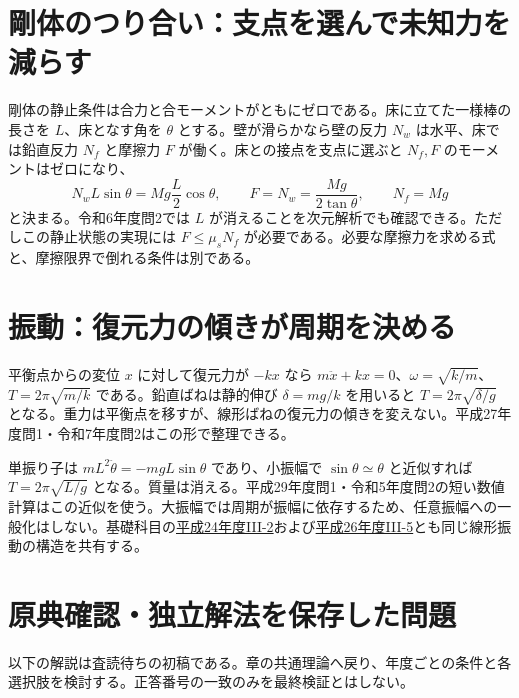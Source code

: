\section{剛体のつり合い：支点を選んで未知力を減らす}
\label{theory:mechanics:equilibrium}
剛体の静止条件は合力と合モーメントがともにゼロである。床に立てた一様棒の長さを $L$、床となす角を $\theta$ とする。壁が滑らかなら壁の反力 $N_w$ は水平、床では鉛直反力 $N_f$ と摩擦力 $F$ が働く。床との接点を支点に選ぶと $N_f,F$ のモーメントはゼロになり、
\[
 N_wL\sin\theta=Mg\frac L2\cos\theta,
 \qquad F=N_w=\frac{Mg}{2\tan\theta},\qquad N_f=Mg
\]
と決まる。令和6年度問2では $L$ が消えることを次元解析でも確認できる。ただしこの静止状態の実現には $F\leq\mu_sN_f$ が必要である。必要な摩擦力を求める式と、摩擦限界で倒れる条件は別である。

\section{振動：復元力の傾きが周期を決める}
\label{theory:mechanics:oscillation}
平衡点からの変位 $x$ に対して復元力が $-kx$ なら $m\ddot x+kx=0$、$\omega=\sqrt{k/m}$、$T=2\pi\sqrt{m/k}$ である。鉛直ばねは静的伸び $\delta=mg/k$ を用いると $T=2\pi\sqrt{\delta/g}$ となる。重力は平衡点を移すが、線形ばねの復元力の傾きを変えない。平成27年度問1・令和7年度問2はこの形で整理できる。

単振り子は $mL^2\ddot\theta=-mgL\sin\theta$ であり、小振幅で $\sin\theta\simeq\theta$ と近似すれば $T=2\pi\sqrt{L/g}$ となる。質量は消える。平成29年度問1・令和5年度問2の短い数値計算はこの近似を使う。大振幅では周期が振幅に依存するため、任意振幅への一般化はしない。基礎科目の\hyperref[q:h24-reg-basic-3-2]{平成24年度III-2}および\hyperref[q:h26-reg-basic-3-5]{平成26年度III-5}とも同じ線形振動の構造を共有する。

\section*{原典確認・独立解法を保存した問題}
以下の解説は査読待ちの初稿である。章の共通理論へ戻り、年度ごとの条件と各選択肢を検討する。正答番号の一致のみを最終検証とはしない。

